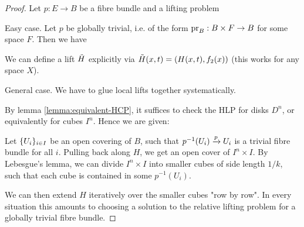 \begin{proof}
Let $p:E\to B$ be a fibre bundle and a lifting problem
\begin{center}
\end{center}

Easy case. Let $p$ be globally trivial, i.e. of the form $\operatorname{pr}_B:B\times F\to B$ for some space $F$. Then we have
\begin{center}
\end{center}
We can define a lift $\tilde H$ explicitly via $\tilde H(x,t)=(H(x,t),f_2(x))$ (this works for any space $X$).

General case. We have to glue local lifts together systematically.

By lemma \ref{lemma:equivalent-HCP}, it suffices to check the HLP for disks $D^n$, or equivalently for cubes $I^n$. Hence we are given:
\begin{center}
\end{center}

Let $\{U_i\}_{i\in I}$ be an open covering of $B$, such that $p^{-1}(U_i)\xrightarrow{p}U_i$ is a trivial fibre bundle for all $i$. Pulling back along $H$, we get an open cover of $I^n\times I$. By Lebesgue's lemma, we can divide $I^n\times I$ into smaller cubes of side length $1/k$, such that each cube is contained in some $p^{-1}(U_i)$.
\medskip

We can then extend $H$ iteratively over the smaller cubes "row by row". In every situation this amounts to choosing a solution to the relative lifting problem for a globally trivial fibre bundle.
\end{proof}


